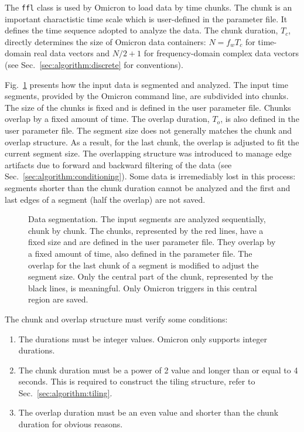The \texttt{ffl} class is used by Omicron to load data by time chunks. The chunk is an important charactistic time scale which is user-defined in the parameter file. It defines the time sequence adopted to analyze the data. The chunk duration, $T_c$, directly determines the size of Omicron data containers: $N=f_wT_c$ for time-domain real data vectors and $N/2+1$ for frequency-domain complex data vectors (see Sec.~\ref{sec:algorithm:discrete} for conventions).

Fig.~\ref{fig:segmentation} presents how the input data is segmented and analyzed. The input time segments, provided by the Omicron command line, are subdivided into chunks. The size of the chunks is fixed and is defined in the user parameter file. Chunks overlap by a fixed amount of time. The overlap duration, $T_o$, is also defined in the user parameter file. The segment size does not generally matches the chunk and overlap structure. As a result, for the last chunk, the overlap is adjusted to fit the current segment size. The overlapping structure was introduced to manage edge artifacts due to forward and backward filtering of the data (see Sec.~\ref{sec:algorithm:conditioning}). Some data is irremediably lost in this process: segments shorter than the chunk duration cannot be analyzed and the first and last edges of a segment (half the overlap) are not saved.
\begin{figure}
  \center
  \caption{Data segmentation. The input segments are analyzed sequentially, chunk by chunk. The chunks, represented by the red lines, have a fixed size and are defined in the user parameter file. They overlap by a fixed amount of time, also defined in the parameter file. The overlap for the last chunk of a segment is modified to adjust the segment size. Only the central part of the chunk, represented by the black lines, is meaningful. Only Omicron triggers in this central region are saved.}
  \label{fig:segmentation}
\end{figure}

The chunk and overlap structure must verify some conditions:
\begin{enumerate}
\item The durations must be integer values. Omicron only supports integer durations.
\item The chunk duration must be a power of 2 value and longer than or equal to 4 seconds. This is required to construct the tiling structure, refer to Sec.~\ref{sec:algorithm:tiling}.
\item The overlap duration must be an even value and shorter than the chunk duration for obvious reasons.
\end{enumerate}

